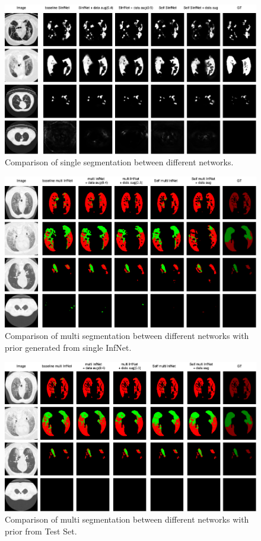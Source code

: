 \begin{figure}
	\includegraphics[width=\linewidth]{comparison_single.png}
	\caption{Comparison of single segmentation between different networks.}
	\label{fig:single-comparison}
\end{figure}
\begin{figure}
	\includegraphics[width=\linewidth]{comparison_multi_weakprior.png}
	\caption{Comparison of multi segmentation between different networks with prior generated from single InfNet.}
	\label{fig:multi-weakprior-comparison}
\end{figure}
\begin{figure}
	\includegraphics[width=\linewidth]{comparison_multi_strongprior.png}
	\caption{Comparison of multi segmentation between different networks with prior from Test Set.}
	\label{fig:multi-strongprior-comparison}
\end{figure}

